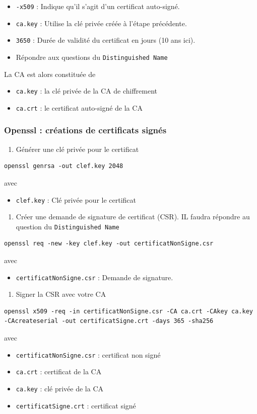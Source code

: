 \documentclass[french, 12pt]{article}%
\newcommand{\itemE}{\item[$\bullet$]}
\begin{document}
\begin{itemize}
\itemE \verb?-x509? : Indique qu'il s'agit d'un certificat auto-signé.
\itemE \verb?ca.key? : Utilise la clé privée créée à l'étape précédente.
\itemE \verb?3650? : Durée de validité du certificat en jours (10 ans ici).
\itemE Répondre aux questions du \verb?Distinguished Name?
\end{itemize}


\vspace{0.5cm}
La CA est alors constituée de
\begin{itemize}
\itemE \verb?ca.key? : la clé privée de la CA de chiffrement
\itemE \verb?ca.crt? : le certificat auto-signé de la CA 
\end{itemize}


\subsubsection{ Openssl : créations de certificats signés}

\begin{enumerate}
\item  Générer une clé privée pour le certificat
\end{enumerate}
\begin{lstlisting}[style=commande]
openssl genrsa -out clef.key 2048
\end{lstlisting}
avec 
\begin{itemize}
\itemE \verb?clef.key? : Clé privée pour le certificat
\end{itemize}

\begin{enumerate}[resume]
\item Créer une demande de signature de certificat (CSR). IL faudra répondre au question du \verb?Distinguished Name?
\end{enumerate}
\begin{lstlisting}[style=commande]
openssl req -new -key clef.key -out certificatNonSigne.csr
\end{lstlisting}
avec 
\begin{itemize}
\itemE \verb?certificatNonSigne.csr? : Demande de signature. 
\end{itemize}


\begin{enumerate}[resume]
\item Signer la CSR avec votre CA
\end{enumerate}
\begin{lstlisting}[style=commande]
openssl x509 -req -in certificatNonSigne.csr -CA ca.crt -CAkey ca.key -CAcreateserial -out certificatSigne.crt -days 365 -sha256
\end{lstlisting}
avec 
\begin{itemize}
\itemE \verb?certificatNonSigne.csr? : certificat non signé
\itemE \verb?ca.crt? : certificat de la CA
\itemE \verb?ca.key? : clé privée de la CA
\itemE \verb?certificatSigne.crt? : certificat signé
\end{itemize}
\end{document}
